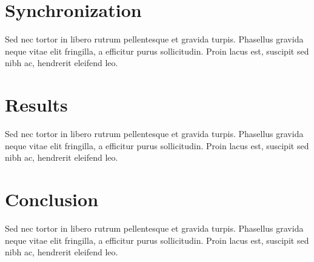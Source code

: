 \documentclass[twocolumn]{phdsymp} %
\begin{document}
\section{Synchronization}
Sed nec tortor in libero rutrum pellentesque\cite{six2014tarsosdsp} et gravida turpis. Phasellus gravida neque vitae elit fringilla, a efficitur purus sollicitudin. Proin lacus est, suscipit sed nibh ac, hendrerit eleifend leo.

\section{Results}
Sed nec tortor in libero rutrum pellentesque\cite{six2014tarsosdsp} et gravida turpis. Phasellus gravida neque vitae elit fringilla, a efficitur purus sollicitudin. Proin lacus est, suscipit sed nibh ac, hendrerit eleifend leo.

\section{Conclusion}
Sed nec tortor in libero rutrum pellentesque\cite{six2014tarsosdsp} et gravida turpis. Phasellus gravida neque vitae elit fringilla, a efficitur purus sollicitudin. Proin lacus est, suscipit sed nibh ac, hendrerit eleifend leo.



\end{document}
